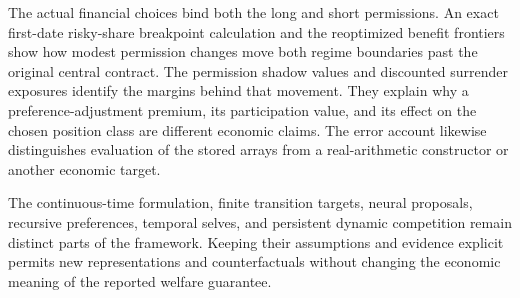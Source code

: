 The actual financial choices bind both the long and short permissions. An exact first-date risky-share breakpoint calculation and the reoptimized benefit frontiers show how modest permission changes move both regime boundaries past the original central contract. The permission shadow values and discounted surrender exposures identify the margins behind that movement. They explain why a preference-adjustment premium, its participation value, and its effect on the chosen position class are different economic claims. The error account likewise distinguishes evaluation of the stored arrays from a real-arithmetic constructor or another economic target.

The continuous-time formulation, finite transition targets, neural proposals, recursive preferences, temporal selves, and persistent dynamic competition remain distinct parts of the framework. Keeping their assumptions and evidence explicit permits new representations and counterfactuals without changing the economic meaning of the reported welfare guarantee.
